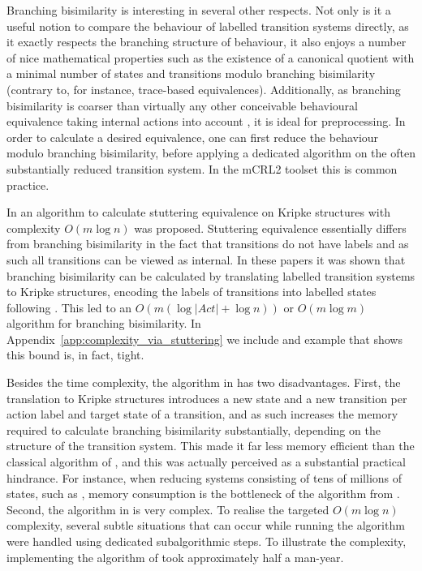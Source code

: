 \documentclass[a4paper,10pt]{article}
\theoremstyle{definition}
\theoremstyle{plain}
\newcommand{\bigo}[1]{{O\!\left(#1\right)}}
\newcommand{\size}[1]{\left\lvert #1 \right\rvert}
\begin{document}
Branching bisimilarity is interesting in several other respects.
Not only is it a useful notion to compare the
behaviour of labelled transition systems directly, as it exactly respects the branching structure of behaviour, it also enjoys a number
of nice mathematical properties such as the existence of a canonical quotient
with a minimal number of states and transitions modulo branching bisimilarity
(contrary to, for instance, trace-based equivalences).
Additionally, as branching bisimilarity is coarser than virtually any other conceivable
behavioural equivalence taking internal actions into account \cite{Gla1993}, it is ideal for preprocessing.
In order to calculate a desired equivalence, one can first reduce the behaviour modulo branching bisimilarity, before applying a dedicated
algorithm on the often substantially reduced transition system. In the mCRL2 toolset \cite{DBLP:conf/tacas/BunteGKLNVWWW19} this is common practice.

In \cite{GJKW2017,GrooteW16tacas} an algorithm to calculate stuttering equivalence on Kripke structures
with complexity $\bigo{m\log n}$ was proposed.
Stuttering equivalence essentially differs from branching bisimilarity in the fact that transitions do not have labels and
as such all transitions can be viewed as internal. In these papers it was shown that branching bisimilarity can be calculated by
translating labelled transition systems to Kripke structures, encoding the labels of transitions into labelled states following \cite{dNV1995,RSW2014}.
This led to an $\bigo{m (\log \size{\mathit{Act}} + \log n)}$ or $\bigo{m \log m}$ algorithm for branching bisimilarity.
In Appendix~\ref{app:complexity_via_stuttering} we include and example that shows this bound is, in fact, tight.

Besides the time complexity, the algorithm in \cite{GJKW2017,GrooteW16tacas} has two disadvantages.
First, the translation to Kripke structures introduces a new state and a new transition
per action label and target state of a transition,
and as such increases the memory required to calculate branching bisimilarity substantially,
depending on the structure of the transition system.
This made it far less memory efficient than the classical algorithm of \cite{GV90},
and this was actually perceived as a substantial practical hindrance.
For instance, when reducing systems consisting of tens of millions of states, such as \cite{BLW2018}, memory consumption is the bottleneck of the algorithm from \cite{GJKW2017,GrooteW16tacas}.
Second, the algorithm in \cite{GJKW2017,GrooteW16tacas} is very complex. To realise the targeted $\bigo{m\log n}$ complexity, several subtle situations that can occur while running the algorithm were handled using dedicated subalgorithmic steps.
To illustrate the complexity, implementing the algorithm of \cite{GJKW2017,GrooteW16tacas} took approximately half a man-year.
\end{document}
